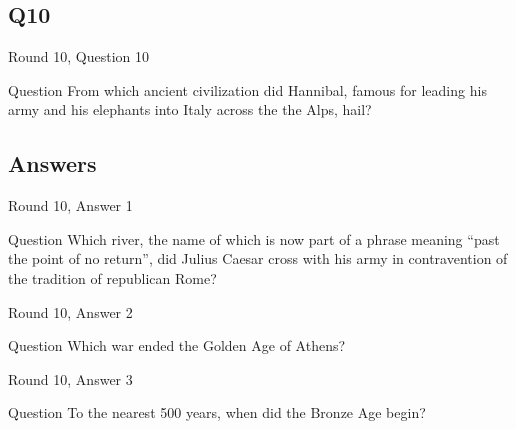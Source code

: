 \documentclass[11pt]{beamer}
\begin{document}
\subsection*{Q10}
\begin{frame}[t]{Round 10, Question 10}
\begin{block}{Question}
From which ancient civilization did Hannibal, famous for leading his army and his elephants into Italy across the the Alps, hail?
\end{block}
\end{frame}
\subsection{Answers}
\begin{frame}[t]{Round 10, Answer 1}
\begin{block}{Question}
Which river, the name of which is now part of a phrase meaning ``past the point of no return'', did Julius Caesar cross with his army in contravention of the tradition of republican Rome?
\end{block}
\end{frame}
\begin{frame}[t]{Round 10, Answer 2}
\begin{block}{Question}
Which war ended the Golden Age of Athens?
\end{block}
\end{frame}
\begin{frame}[t]{Round 10, Answer 3}
\begin{block}{Question}
To the nearest 500 years, when did the Bronze Age begin?
\end{block}
\end{frame}
\end{document}
